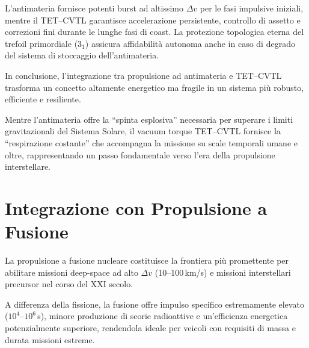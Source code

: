 \documentclass[11pt,a4paper]{article}
\theoremstyle{plain}
\theoremstyle{definition}
\begin{document}
\vspace{0.4cm}


L’antimateria fornisce potenti burst ad altissimo $\Delta v$ per le fasi impulsive iniziali, mentre il TET--CVTL garantisce accelerazione persistente, controllo di assetto e correzioni fini durante le lunghe fasi di coast. 
La protezione topologica eterna del trefoil primordiale ($3_1$) assicura affidabilità autonoma anche in caso di degrado del sistema di stoccaggio dell’antimateria.

\vspace{0.3cm}

In conclusione, l’integrazione tra propulsione ad antimateria e TET--CVTL trasforma un concetto altamente energetico ma fragile in un sistema più robusto, efficiente e resiliente. 


\vspace{0.3cm}


Mentre l’antimateria offre la “spinta esplosiva” necessaria per superare i limiti gravitazionali del Sistema Solare, il vacuum torque TET--CVTL fornisce la “respirazione costante” che accompagna la missione su scale temporali umane e oltre, rappresentando un passo fondamentale verso l’era della propulsione interstellare.





\vspace{0.5cm}






\section{Integrazione con Propulsione a Fusione}

\vspace{0.2cm}

La propulsione a fusione nucleare costituisce la frontiera più promettente per abilitare missioni deep-space ad alto $\Delta v$ (10--100\,km/s) e missioni interstellari precursor nel corso del XXI secolo. 

\vspace{0.3cm}


A differenza della fissione, la fusione offre impulso specifico estremamente elevato ($10^4$--$10^6$\,s), minore produzione di scorie radioattive e un’efficienza energetica potenzialmente superiore, rendendola ideale per veicoli con requisiti di massa e durata missioni estreme.

\vspace{0.3cm}
\end{document}
